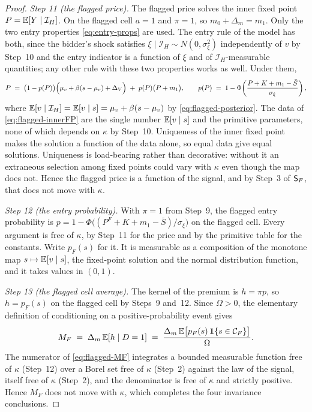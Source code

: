 \begin{proof}
\emph{Step 11 (the flagged price).} The flagged price solves the inner fixed point
$P=\mathbb{E}[Y\mid\mathcal I_H]$. On the flagged cell $a=1$ and $\pi=1$, so
$m_0+\Delta_m=m_1$. Only the two entry properties \eqref{eq:entry-props} are used. The entry rule of
the model has both, since the bidder's shock satisfies $\xi\mid\mathcal I_H \sim N(0,\sigma_\xi^2)$
independently of $v$ by Step~10 and the entry indicator is a function of $\xi$ and of
$\mathcal I_H$-measurable quantities; any other rule with these two properties works as well. Under
them,
\begin{equation}
\label{eq:flagged-innerFP}
P \;=\; \bigl(1-p(P)\bigr)\Bigl(\mu_v+\beta(s-\mu_v)+\Delta_V\Bigr) \;+\; p(P)\bigl(P+m_1\bigr),
\qquad
p(P) \;=\; 1-\Phi\!\left(\frac{P+K+m_1-\bar S}{\sigma_\xi}\right),
\end{equation}
where $\mathbb{E}[v\mid\mathcal I_H]=\mathbb{E}[v\mid s]=\mu_v+\beta(s-\mu_v)$ by
\eqref{eq:flagged-posterior}. The data of \eqref{eq:flagged-innerFP} are the single number
$\mathbb{E}[v\mid s]$ and the primitive parameters, none of which depends on $\kappa$ by Step~10.
Uniqueness of the inner fixed point makes the solution a function of the data alone, so equal data
give equal solutions. Uniqueness is load-bearing rather than decorative: without it an extraneous
selection among fixed points could vary with $\kappa$ even though the map does not. Hence the flagged
price is a function of the signal, and by Step~3 of $\mathsf{S}_F$, that does not move with $\kappa$.

\emph{Step 12 (the entry probability).} With $\pi=1$ from Step~9, the flagged entry probability is
$p=1-\Phi\bigl((P^F+K+m_1-\bar S)/\sigma_\xi\bigr)$ on the flagged cell. Every argument is free of
$\kappa$, by Step~11 for the price and by the primitive table for the constants. Write $p_F(s)$ for
it. It is measurable as a composition of the monotone map $s\mapsto\mathbb{E}[v\mid s]$, the fixed-point
solution and the normal distribution function, and it takes values in $(0,1)$.

\emph{Step 13 (the flagged cell average).} The kernel of the premium is $h=\pi p$, so $h=p_F(s)$ on
the flagged cell by Steps~9 and~12. Since $\Omega>0$, the elementary definition of conditioning on
a positive-probability event gives
\begin{equation}
\label{eq:flagged-MF}
M_F \;=\; \Delta_m\,\mathbb{E}[h \mid D=1]
     \;=\; \frac{\Delta_m\,\mathbb{E}\bigl[p_F(s)\,\mathbf{1}\{s \in \mathcal C_F\}\bigr]}{\Omega} .
\end{equation}
The numerator of \eqref{eq:flagged-MF} integrates a bounded measurable function free of $\kappa$
(Step~12) over a Borel set free of $\kappa$ (Step~2) against the law of the signal, itself free of
$\kappa$ (Step~2), and the denominator is free of $\kappa$ and strictly positive. Hence $M_F$ does
not move with $\kappa$, which completes the four invariance conclusions.
\end{proof}

